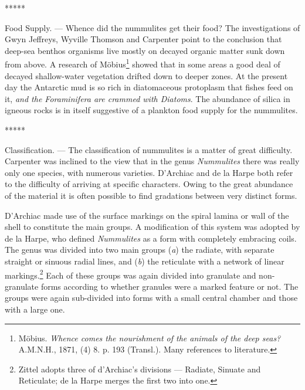 \documentclass[a4paper, 12pt, oneside]{article}
\begin{document}
\centerline{*\hspace{15mm}*\hspace{15mm}*\hspace{15mm}*\hspace{15mm}*}
\bigskip

Food Supply. --- Whence did the nummulites get their food? The investigations of Gwyn Jeffreys, Wyville Thomson and Carpenter point to the conclusion that deep-sea benthos organisms live mostly on decayed organic matter sunk down from above. A research of Möbius\footnote{Möbius. \emph{Whence comes the nourishment of the animals of the deep seas?} A.M.N.H., 1871, (4) 8. p. 193 (Transl.). Many references to literature.} showed that in some areas a good deal of decayed shallow-water vegetation drifted down to deeper zones. At the present day the Antarctic mud is so rich in diatomaceous protoplasm that fishes feed on it, \emph{and the Foraminifera are crammed with Diatoms}. The abundance of silica in igneous rocks is in itself suggestive of a plankton food supply for the nummulites.

\centerline{*\hspace{15mm}*\hspace{15mm}*\hspace{15mm}*\hspace{15mm}*}
\bigskip

Classification. --- The classification of nummulites is a matter of great difficulty. Carpenter was inclined to the view that in the genus \emph{Nummulites} there was really only one species, with numerous varieties. D'Archiac and de la Harpe both refer to the difficulty of arriving at specific characters. Owing to the great abundance of the material it is often possible to find gradations between very distinct forms.

D'Archiac made use of the surface markings on the spiral lamina or wall of the shell to constitute the main groups. A modification of this system was adopted by de la Harpe, who defined \emph{Nummulites} as a form with completely embracing coils. The genus was divided into two main groups (\emph{a}) the radiate, with separate straight or sinuous radial lines, and (\emph{b}) the reticulate with a network of linear markings.\footnote{Zittel adopts three of d'Archiac's divisions --- Radiate, Sinuate and Reticulate; de la Harpe merges the first two into one.} Each of these groups was again divided into granulate and non-granulate forms according to whether granules were a marked feature or not. The groups were again sub-divided into forms with a small central chamber and those with a large one.
\end{document}

